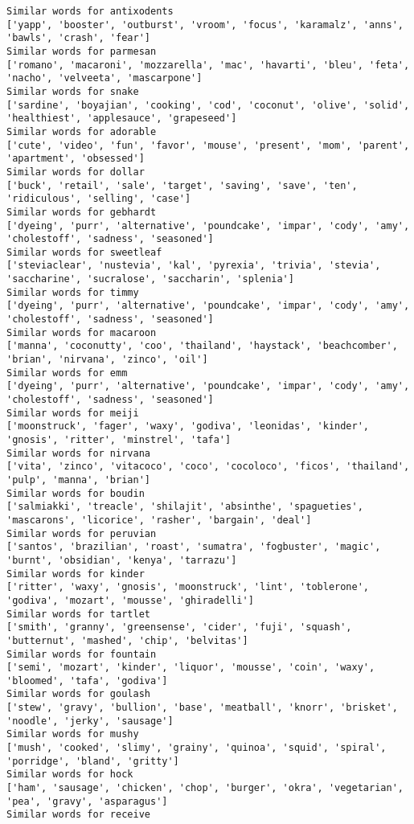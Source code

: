 \documentclass[11pt]{article}
\begin{document}
\begin{Verbatim}[commandchars=\\\{\}]
Similar words for antixodents
['yapp', 'booster', 'outburst', 'vroom', 'focus', 'karamalz', 'anns', 'bawls', 'crash', 'fear']
Similar words for parmesan
['romano', 'macaroni', 'mozzarella', 'mac', 'havarti', 'bleu', 'feta', 'nacho', 'velveeta', 'mascarpone']
Similar words for snake
['sardine', 'boyajian', 'cooking', 'cod', 'coconut', 'olive', 'solid', 'healthiest', 'applesauce', 'grapeseed']
Similar words for adorable
['cute', 'video', 'fun', 'favor', 'mouse', 'present', 'mom', 'parent', 'apartment', 'obsessed']
Similar words for dollar
['buck', 'retail', 'sale', 'target', 'saving', 'save', 'ten', 'ridiculous', 'selling', 'case']
Similar words for gebhardt
['dyeing', 'purr', 'alternative', 'poundcake', 'impar', 'cody', 'amy', 'cholestoff', 'sadness', 'seasoned']
Similar words for sweetleaf
['steviaclear', 'nustevia', 'kal', 'pyrexia', 'trivia', 'stevia', 'saccharine', 'sucralose', 'saccharin', 'splenia']
Similar words for timmy
['dyeing', 'purr', 'alternative', 'poundcake', 'impar', 'cody', 'amy', 'cholestoff', 'sadness', 'seasoned']
Similar words for macaroon
['manna', 'coconutty', 'coo', 'thailand', 'haystack', 'beachcomber', 'brian', 'nirvana', 'zinco', 'oil']
Similar words for emm
['dyeing', 'purr', 'alternative', 'poundcake', 'impar', 'cody', 'amy', 'cholestoff', 'sadness', 'seasoned']
Similar words for meiji
['moonstruck', 'fager', 'waxy', 'godiva', 'leonidas', 'kinder', 'gnosis', 'ritter', 'minstrel', 'tafa']
Similar words for nirvana
['vita', 'zinco', 'vitacoco', 'coco', 'cocoloco', 'ficos', 'thailand', 'pulp', 'manna', 'brian']
Similar words for boudin
['salmiakki', 'treacle', 'shilajit', 'absinthe', 'spagueties', 'mascarons', 'licorice', 'rasher', 'bargain', 'deal']
Similar words for peruvian
['santos', 'brazilian', 'roast', 'sumatra', 'fogbuster', 'magic', 'burnt', 'obsidian', 'kenya', 'tarrazu']
Similar words for kinder
['ritter', 'waxy', 'gnosis', 'moonstruck', 'lint', 'toblerone', 'godiva', 'mozart', 'mousse', 'ghiradelli']
Similar words for tartlet
['smith', 'granny', 'greensense', 'cider', 'fuji', 'squash', 'butternut', 'mashed', 'chip', 'belvitas']
Similar words for fountain
['semi', 'mozart', 'kinder', 'liquor', 'mousse', 'coin', 'waxy', 'bloomed', 'tafa', 'godiva']
Similar words for goulash
['stew', 'gravy', 'bullion', 'base', 'meatball', 'knorr', 'brisket', 'noodle', 'jerky', 'sausage']
Similar words for mushy
['mush', 'cooked', 'slimy', 'grainy', 'quinoa', 'squid', 'spiral', 'porridge', 'bland', 'gritty']
Similar words for hock
['ham', 'sausage', 'chicken', 'chop', 'burger', 'okra', 'vegetarian', 'pea', 'gravy', 'asparagus']
Similar words for receive

\end{Verbatim}
\end{document}
